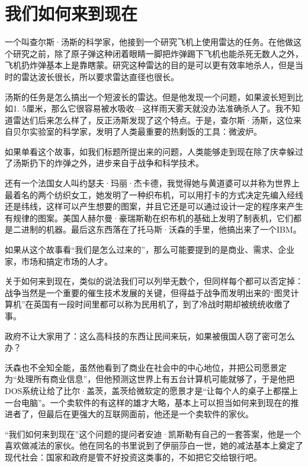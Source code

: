 \hypertarget{ux6211ux4eecux5982ux4f55ux6765ux5230ux73b0ux5728}{%
\section{我们如何来到现在}\label{ux6211ux4eecux5982ux4f55ux6765ux5230ux73b0ux5728}}

一个叫查尔斯·汤斯的科学家，他接到一个研究飞机上使用雷达的任务。在他做这个研究之前，除了原子弹这种闭着眼睛一脚把炸弹踢下飞机也能杀死无数人之外，飞机扔炸弹基本上是靠瞎蒙。研究这种雷达的目的是可以更有效率地杀人，但是当时的雷达波长很长，所以要求雷达直径也很长。

汤斯的任务是怎么搞出一个短波长的雷达。但是他发现一个问题，如果波长短到比如1.
5厘米，那么它很容易被水吸收---这样雨天雾天就没办法准确杀人了。我不知道雷达们后来怎么样了，反正汤斯发现了这个特点。于是，查尔斯·汤斯，这位来自贝尔实验室的科学家，发明了人类最重要的热剩饭的工具：微波炉。

如果单看这个故事，如我们标题所提出来的问题，人类能够走到现在除了庆幸躲过了汤斯扔下的炸弹之外，进步来自于战争和科学技术。

还有一个法国女人叫约瑟夫·玛丽·杰卡德，我觉得她与黄道婆可以并称为世界上最着名的两个纺织女工，她发明了一种织布机，可以用打卡的方式决定先编入经线还是纬线，这样可以产生想要的图案，并且它还是可以通过设计一定的程序来产生有规律的图案。美国人赫尔曼·豪瑞斯勒在织布机的基础上发明了制表机，它们都是二进制的机器。最后这东西落在了托马斯·沃森的手里，他搞出来了一个IBM。

如果从这个故事看``我们是怎么过来的''，那么可能要提到的是商业、需求、企业家，市场和搞定市场的人才。

关于如何来到现在，类似的说法我们可以列举无数个，但同样每个都可以否定掉：战争当然是一个重要的催生技术发展的关键，但得益于战争而发明出来的``图灵计算机''在英国有一段时间里都可以称为民用机了，到了冷战时期却被统统收缴了事。

政府不让大家用了：这么高科技的东西让民间来玩，如果被俄国人窃了密可怎么办？

沃森也不全知全能，虽然他看到了商业在社会中的中心地位，并把公司愿景定为``处理所有商业信息''，但他预测这世界上有五台计算机可能就够了，于是他把DOS系统让给了比尔·盖茨，盖茨给微软定的愿景才是``让每个人的桌子上都摆上一台电脑''。一个卖软件的有这样的雄才大略，基本上可以担当如何来到现在的推进者了，但最后在更强大的互联网面前，他还是一个卖软件的家伙。

``我们如何来到现在''这个问题的提问者安迪·凯斯勒有自己的一套答案，他是一个喜欢做减法的家伙。他在同名的书里说到了伊丽莎白一世，她的减法基本上奠定了现代社会：国家和政府是管不好投资这类事的，不如把它交给银行吧。

